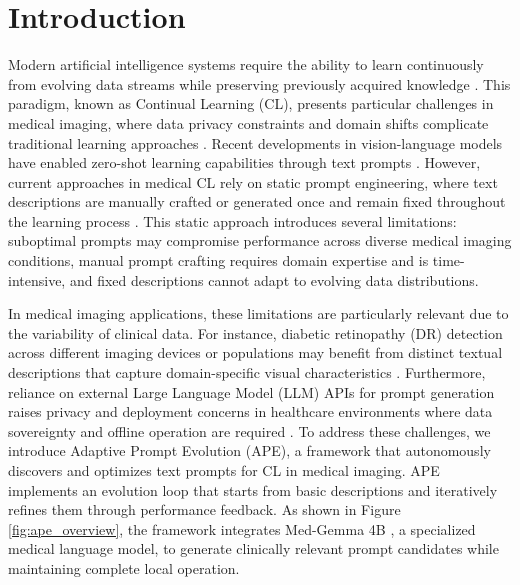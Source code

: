 \documentclass[pdflatex,sn-mathphys-num]{sn-jnl}%
\theoremstyle{thmstyleone}%
\theoremstyle{thmstyletwo}%
\theoremstyle{thmstylethree}%
\begin{document}



\maketitle

\section{Introduction}
\label{sec:introduction}

Modern artificial intelligence systems require the ability to learn continuously from evolving data streams while preserving previously acquired knowledge \cite{Parisi2019}. This paradigm, known as Continual Learning (CL), presents particular challenges in medical imaging, where data privacy constraints and domain shifts complicate traditional learning approaches \cite{wang2024,Delange2021,Kirkpatrick2017,Robins1993}. Recent developments in vision-language models have enabled zero-shot learning capabilities through text prompts \cite{Radford2021}. However, current approaches in medical CL rely on static prompt engineering, where text descriptions are manually crafted or generated once and remain fixed throughout the learning process \cite{BravoRocca2025}. This static approach introduces several limitations: suboptimal prompts may compromise performance across diverse medical imaging conditions, manual prompt crafting requires domain expertise and is time-intensive, and fixed descriptions cannot adapt to evolving data distributions.

In medical imaging applications, these limitations are particularly relevant due to the variability of clinical data. For instance, diabetic retinopathy (DR) detection across different imaging devices or populations may benefit from distinct textual descriptions that capture domain-specific visual characteristics \cite{koh2022online}. Furthermore, reliance on external Large Language Model (LLM) APIs for prompt generation raises privacy and deployment concerns in healthcare environments where data sovereignty and offline operation are required \cite{kumar2018example,kumari2023deep,lenga2020continual}. To address these challenges, we introduce Adaptive Prompt Evolution (APE), a framework that autonomously discovers and optimizes text prompts for CL in medical imaging. APE implements an evolution loop that starts from basic descriptions and iteratively refines them through performance feedback. As shown in Figure \ref{fig:ape_overview}, the framework integrates Med-Gemma 4B \cite{medgemma-hf}, a specialized medical language model, to generate clinically relevant prompt candidates while maintaining complete local operation.
\end{document}
